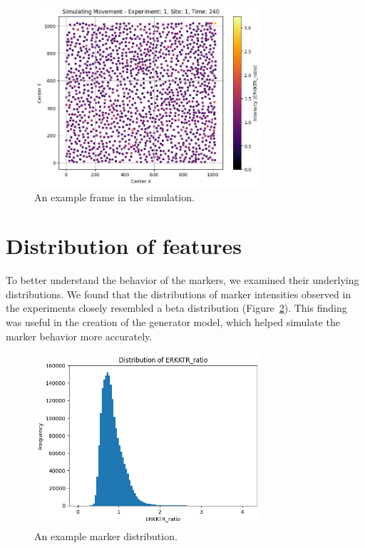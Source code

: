 \documentclass[licencjacka,en]{pracamgr}
\begin{document}
\begin{figure}[ht]
    \centering
    \includegraphics[width=0.75\textwidth]{images/simulation.png}
    \caption{An example frame in the simulation.}
    \label{fig:simulation}
\end{figure} 

\section{Distribution of features}
To better understand the behavior of the markers, we examined their underlying distributions. We found that the distributions of marker intensities observed in the experiments closely resembled a beta distribution (Figure~\ref{fig:markers}). This finding was useful in the creation of the generator model, which helped simulate the marker behavior more accurately.

\begin{figure}[ht]
    \centering
    \includegraphics[width=0.75\textwidth]{images/marker_distribution.png}
    \caption{An example marker distribution.}
    \label{fig:markers}
\end{figure} 
\end{document}
